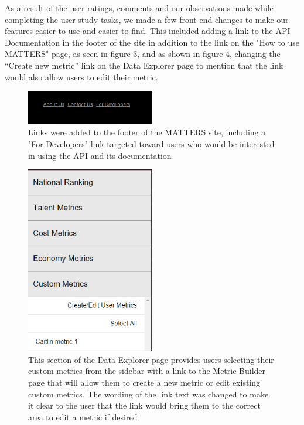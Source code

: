 	As a result of the user ratings, comments and our observations made while completing the user study tasks, we made a few front end changes to make our features easier to use and easier to find. This included adding a link to the API Documentation in the footer of the site in addition to the link on the "How to use MATTERS" page, as seen in figure 3, and as shown in figure 4, changing the “Create new metric” link on the Data Explorer page to mention that the link would also allow users to edit their metric. 
	
		\begin{figure}[!ht]
			\centering
			\includegraphics[width=0.5\textwidth]{images/footer.png}
		\caption{Links were added to the footer of the MATTERS site, including a "For Developers" link targeted toward users who would be interested in using the API and its documentation}
		\end{figure}
		
		\begin{figure}[!ht]
				\centering
				\includegraphics[width=0.5\textwidth]{images/edit.png}
			\caption{This section of the Data Explorer page provides users selecting their custom metrics from the sidebar with a link to the Metric Builder page that will allow them to create a new metric or edit existing custom metrics. The wording of the link text was changed to make it clear to the user that the link would bring them to the correct area to edit a metric if desired}
		\end{figure}
	
